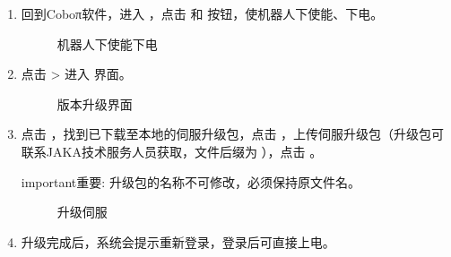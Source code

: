 \documentclass[a4paper,11pt,english,openany,oneside]{sphinxmanual}
\begin{document}
\sphinxAtStartPar
{}
\begin{enumerate}
%
\item {} 
\sphinxAtStartPar
回到Coboπ软件，进入 ，点击  和  按钮，使机器人下使能、下电。

\begin{figure}[H]
\centering
\capstart

\noindent{}
\caption{机器人下使能下电}\label{\detokenize{_u66f4_u6362_u5173_u8282:id159}}\end{figure}

\item {} 
\sphinxAtStartPar
点击  >  进入  界面。

\begin{figure}[H]
\centering
\capstart

\noindent{}
\caption{版本升级界面}\label{\detokenize{_u66f4_u6362_u5173_u8282:id160}}\end{figure}

\item {} 
\sphinxAtStartPar
点击 ，找到已下载至本地的伺服升级包，点击 ，上传伺服升级包（升级包可联系JAKA技术服务人员获取，文件后缀为  ），点击  。

\begin{sphinxadmonition}{important}{重要:}
\sphinxAtStartPar
升级包的名称不可修改，必须保持原文件名。
\end{sphinxadmonition}

\begin{figure}[H]
\centering
\capstart

\noindent{}
\caption{升级伺服}\label{\detokenize{_u66f4_u6362_u5173_u8282:id161}}\end{figure}

\item {} 
\sphinxAtStartPar
升级完成后，系统会提示重新登录，登录后可直接上电。

\end{enumerate}
\end{document}
